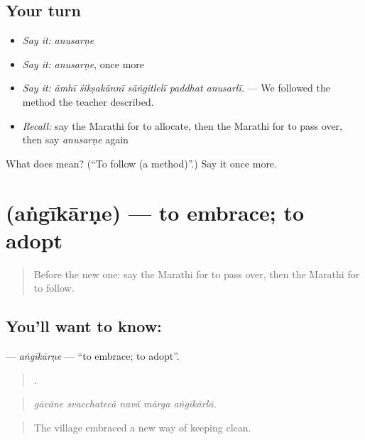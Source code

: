 \subsection*{Your turn}
\begin{itemize}
\raggedright
  \item \emph{Say it:} \emph{anusarṇe}
  \item \emph{Say it:} \emph{anusarṇe}, once more
  \item \emph{Say it:} \emph{āmhī śikṣakānnī sāṅgitlelī paddhat anusarlī.} — We followed the method the teacher described.
  \item \emph{Recall:} say the Marathi for to allocate, then the Marathi for to pass over, then say \emph{anusarṇe} again
\end{itemize}

\begin{tcolorbox}[breakable,colback=teal!4,colframe=teal!35!black,title={Before you move on}]
What does  mean? (\textquotedblleft{}To follow (a method)\textquotedblright{}.) Say it once more.
\end{tcolorbox}
\section[\texorpdfstring{\mr{अंगीकारणे} (aṅgīkārṇe)}{अंगीकारणे (aṅgīkārṇe)}]{ (aṅgīkārṇe) — to embrace; to adopt}

\label{lesson:MR-C392-angikarne}



\begin{quote}
Before the new one: say the Marathi for to pass over, then the Marathi for to follow.
\end{quote}

\subsection*{You'll want to know: }
\textbf{} — \emph{aṅgīkārṇe} — \textquotedblleft{}to embrace; to adopt\textquotedblright{}.

\begin{quote}
    .
\end{quote}

\begin{quote}
\emph{gāvāne svacchatecā navā mārga aṅgīkārlā.}
\end{quote}

\begin{quote}
The village embraced a new way of keeping clean.
\end{quote}

